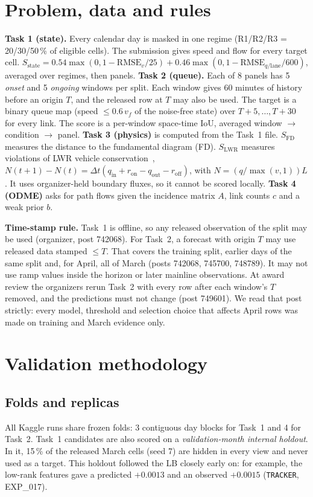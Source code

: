 \documentclass[conference,10pt]{IEEEtran}
\newcommand{\file}[1]{\texttt{\small #1}}
\begin{document}
\section{Problem, data and rules}\label{sec:problem}
\textbf{Task 1 (state).} Every calendar day is masked in one regime (R1/R2/R3 = 20/30/50\,\% of eligible cells).
The submission gives speed and flow for every target cell. $S_\text{state}=0.54\max(0,1-\text{RMSE}_v/25)
+0.46\max(0,1-\text{RMSE}_{q/\text{lane}}/600)$, averaged over regimes, then panels.
\textbf{Task 2 (queue).} Each of 8 panels has 5 \emph{onset} and 5 \emph{ongoing} windows per split. Each window gives 60 minutes of
history before an origin $T$, and the released row at $T$ may also be used. The target is a binary queue map (speed $\le
0.6\,v_f$ of the noise-free state) over $T{+}5,\dots,T{+}30$ for every link. The score is a per-window space-time IoU, averaged
window $\to$ condition $\to$ panel.
\textbf{Task 3 (physics)} is computed from the Task~1 file. $S_\text{FD}$ measures the distance to the
fundamental diagram (FD). $S_\text{LWR}$ measures violations of LWR vehicle conservation~\cite{lwr1}, $N(t{+}1)-N(t)=\Delta t(q_\text{in}+r_\text{on}-q_\text{out}-r_\text{off})$, with
$N=(q/\max(v,1))L$. It uses organizer-held boundary fluxes, so it cannot be scored locally.
\textbf{Task 4 (ODME)} asks for path flows given the incidence matrix $A$, link counts $c$ and a weak prior $b$.

\textbf{Time-stamp rule.} Task~1 is offline, so any released observation of the split may be used (organizer, post 742068).
For Task~2, a forecast with origin $T$ may use released data stamped $\le T$. That covers the training split, earlier
days of the same split and, for April, all of March (posts 742068, 745700, 748789). It may not use ramp values inside
the horizon or later mainline observations. At award review the organizers rerun Task~2 with every row after each
window's $T$ removed, and the predictions must not change (post 749601). We read that post strictly:
every model, threshold and selection choice that affects April rows was made on training and March evidence only.

\section{Validation methodology}\label{sec:val}
\subsection{Folds and replicas}
All Kaggle runs share frozen folds: 3 contiguous day blocks for Task~1 and 4 for Task~2. Task~1 candidates are also scored on a
\emph{validation-month internal holdout}. In it, 15\,\% of the released March cells (seed 7) are hidden in every view and never used as
a target. This holdout followed the LB closely early on: for example, the low-rank features gave a predicted $+0.0013$ and an observed
$+0.0015$ (\file{TRACKER}, EXP\_017).
\end{document}
